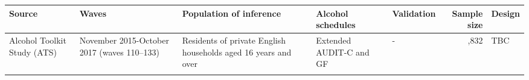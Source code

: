 \documentclass[]{article}
\begin{document}
\begin{longtable}[]{@{}lllllrl@{}}
\toprule
\begin{minipage}[b]{0.12\columnwidth}\raggedright
Source\strut
\end{minipage} & \begin{minipage}[b]{0.12\columnwidth}\raggedright
Waves\strut
\end{minipage} & \begin{minipage}[b]{0.12\columnwidth}\raggedright
Population of inference\strut
\end{minipage} & \begin{minipage}[b]{0.12\columnwidth}\raggedright
Alcohol schedules\strut
\end{minipage} & \begin{minipage}[b]{0.12\columnwidth}\raggedright
Validation\strut
\end{minipage} & \begin{minipage}[b]{0.07\columnwidth}\raggedleft
Sample size\strut
\end{minipage} & \begin{minipage}[b]{0.12\columnwidth}\raggedright
Design\strut
\end{minipage}\tabularnewline
\midrule
\endhead
\begin{minipage}[t]{0.12\columnwidth}\raggedright
Alcohol Toolkit Study (ATS) \citep{Beard2015a}\strut
\end{minipage} & \begin{minipage}[t]{0.12\columnwidth}\raggedright
November 2015-October 2017 (waves 110--133)\strut
\end{minipage} & \begin{minipage}[t]{0.12\columnwidth}\raggedright
Residents of private English households aged 16 years and over\strut
\end{minipage} & \begin{minipage}[t]{0.12\columnwidth}\raggedright
Extended AUDIT-C and GF\strut
\end{minipage} & \begin{minipage}[t]{0.12\columnwidth}\raggedright
-\strut
\end{minipage} & \begin{minipage}[t]{0.07\columnwidth}\raggedleft
40,832\strut
\end{minipage} & \begin{minipage}[t]{0.12\columnwidth}\raggedright
TBC\strut
\end{minipage}\tabularnewline
\begin{minipage}[t]{0.12\columnwidth}\raggedright

\end{minipage}
\end{longtable}
\end{document}
